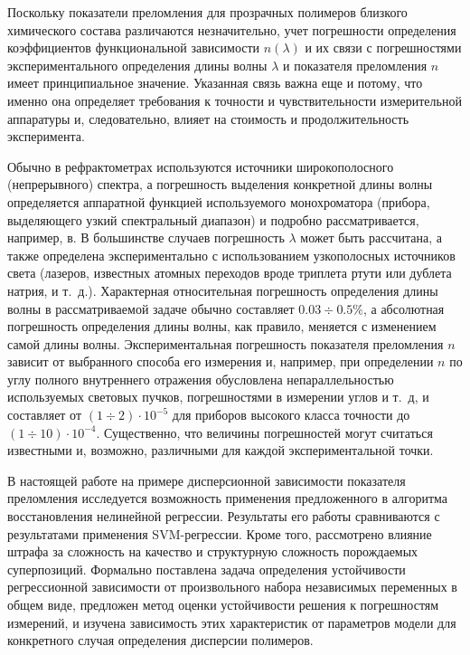\documentclass[12pt,a4paper]{article}
\begin{document}
Поскольку показатели преломления для прозрачных полимеров близкого химического
состава различаются незначительно, учет погрешности определения коэффициентов
функциональной зависимости $n(\lambda)$ и их связи с погрешностями
экспериментального определения длины волны $\lambda$ и показателя преломления
$n$ имеет принципиальное значение. Указанная связь важна еще и потому, что
именно она определяет требования к точности и чувствительности измерительной
аппаратуры и, следовательно, влияет на стоимость и продолжительность
эксперимента.

Обычно в рефрактометрах используются источники широкополосного (непрерывного)
спектра, а погрешность выделения конкретной длины волны определяется аппаратной
функцией используемого монохроматора (прибора, выделяющего узкий спектральный
диапазон) и подробно рассматривается, например, в\cite{Malishev79,Zaidel72}.
В большинстве случаев погрешность $\lambda$ может быть рассчитана, а также
определена экспериментально с использованием узкополосных источников света
(лазеров, известных атомных переходов вроде триплета ртути или дублета натрия,
и т.~д.). Характерная относительная погрешность определения длины волны в
рассматриваемой задаче обычно составляет $0.03 \div 0.5\%$, а 
абсолютная погрешность определения длины волны, как правило, меняется с
изменением самой длины волны. Экспериментальная погрешность показателя
преломления $n$ зависит от выбранного способа его измерения и, например,
при определении $n$ по углу полного внутреннего отражения обусловлена
непараллельностью используемых световых пучков, погрешностями в измерении углов
и т.~д, и составляет от $(1 \div 2) \cdot 10^{-5}$ для приборов высокого класса
точности до $(1 \div 10) \cdot 10^{-4}$. Существенно, что величины погрешностей
могут считаться известными и, возможно, различными для каждой экспериментальной точки.

В настоящей работе на примере дисперсионной зависимости показателя преломления
исследуется возможность применения предложенного в \cite{Rudoy13} алгоритма
восстановления нелинейной регрессии. Результаты его работы сравниваются с
результатами применения SVM-регрессии. Кроме того, рассмотрено влияние штрафа
за сложность на качество и структурную сложность порождаемых суперпозиций.
Формально поставлена задача определения устойчивости регрессионной зависимости
от произвольного набора независимых переменных в общем виде, предложен метод
оценки устойчивости решения к погрешностям измерений, и изучена зависимость
этих характеристик от параметров модели для конкретного случая определения
дисперсии полимеров.
\end{document}
